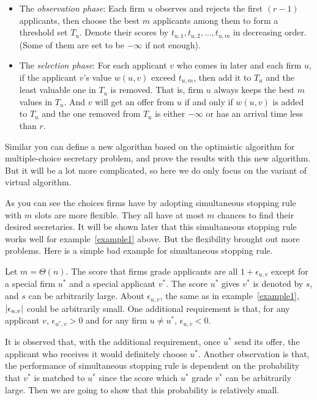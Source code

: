 \begin{itemize}
    \item 
        The \emph{observation phase}:
        Each firm $u$ observes and rejects the first $(r - 1)$ applicants,
        then choose the best $m$ applicants among them 
        to form a threshold set $T_u$.
        Denote their scores by $t_{u,1}, t_{u,2}, \dots, t_{u,m}$
        in decreasing order.
        (Some of them are set to be $-\infty$ if not enough).

   \item 
       The \emph{selection phase}:
       For each applicant $v$ who comes in later and each firm $u$, if the
       applicant $v$'s value $w(u,v)$ exceed $t_{u,m}$,
       then add it to $T_u$ and the least valuable one in $T_u$ is removed.
       That is, firm $u$ always keeps the best $m$ values in $T_u$.
       And $v$ will get an offer from $u$ if and only if $w(u,v)$ 
       is added to $T_u$ and the one removed from $T_u$ 
       is either $-\infty$ or has an arrival time less than $r$.
\end{itemize}

Similar you can define a new algorithm based on the optimistic algorithm for
multiple-choice secretary problem, and prove the results with this new
algorithm. But it will be a lot more complicated, so here we do only
focus on the variant of virtual algorithm.

As you can see the choices firms have by adopting simultaneous stopping
rule with $m$ slots are more flexible. They all have at most $m$ chances
to find their desired secretaries.
It will be shown later that this simultaneous stopping rule works well
for example~\ref{example1} above.
But the flexibility brought out more problems.
Here is a simple bad example for simultaneous stopping rule.

\begin{example}\label{example2}
    Let $m = \Theta(n)$. The score that firms grade applicants are all
    $1 + \epsilon_{u,v}$ except for a special firm $u^*$ and a special
    applicant $v^*$. The score $u^*$ gives $v^*$ is denoted by $s$,
    and $s$ can be arbitrarily large.
    About $\epsilon_{u, v}$, the same as in example~\ref{example1}, 
    $\left\vert\epsilon_{u, v}\right\vert$ could be arbitrarily small.
    One additional requirement is that, for any 
    applicant $v$, $\epsilon_{u^*, v} > 0$ and for any firm $u \neq u^*$, 
    $\epsilon_{u, v} < 0$.
\end{example}

It is observed that, with the additional requirement, once $u^*$ send its
offer, the applicant who receives it would definitely choose $u^*$.
Another observation is that, 
the performance of simultaneous stopping rule is dependent on
the probability that $v^*$ is matched to $u^*$ since the score which
$u^*$ grade $v^*$ can be arbitrarily large.
Then we are going to show that this probability is relatively small.

